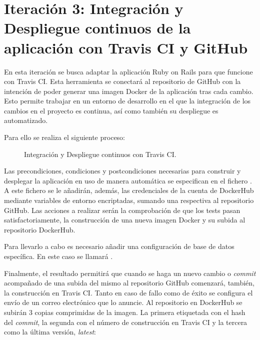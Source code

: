 \section[Iteración 3: Integración y Despliegue continuos]{Iteración 3: Integración y Despliegue continuos de la aplicación con Travis CI y GitHub}

En esta iteración se busca adaptar la aplicación Ruby on Rails para que funcione con Travis CI. Esta herramienta se conectará al repositorio de GitHub  con la intención de poder generar una imagen Docker de la aplicación tras cada cambio. Esto permite trabajar en un entorno de desarrollo en el que la integración de los cambios en el proyecto es continua, así como también su despliegue es automatizado.

Para ello se realiza el siguiente proceso:
\begin{figure}[H]
\caption{Integración y Despliegue continuos con Travis CI.}
\end{figure}

Las precondiciones, condiciones y postcondiciones necesarias para construir y desplegar la aplicación en uso de manera automática se especifican en el fichero . A este fichero se le añadirán, además, las credenciales de la cuenta de DockerHub mediante variables de entorno encriptadas, sumando una respectiva al repositorio GitHub. Las acciones a realizar serán la comprobación de que los tests pasan satisfactoriamente, la construcción de una nueva imagen Docker y su subida al repositorio DockerHub.

Para llevarlo a cabo es necesario añadir una configuración de base de datos específica. En este caso se llamará .

Finalmente, el resultado permitirá que cuando se haga un nuevo cambio o \textit{commit} acompañado de una subida del mismo al repositorio GitHub comenzará, también, la construcción en Travis CI. Tanto en caso de fallo como de éxito se configura el envío de un correo electrónico que lo anuncie. Al repositorio en DockerHub se subirán 3 copias comprimidas de la imagen. La primera etiquetada con el hash del \textit{commit}, la segunda con el número de construcción en Travis CI y la tercera como la última versión, \textit{latest}:

